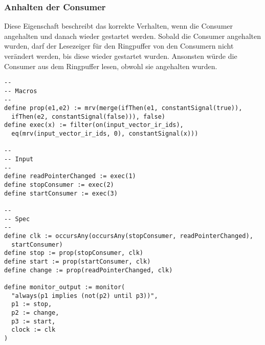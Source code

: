 \documentclass{article}
\begin{document}
\subsubsection{Anhalten der Consumer}

Diese Eigenschaft beschreibt das korrekte Verhalten, wenn die Consumer angehalten und danach wieder gestartet werden. Sobald die Consumer angehalten wurden, darf der Lesezeiger für den Ringpuffer von den Consumern nicht verändert werden, bis diese wieder gestartet wurden. Ansonsten würde die Consumer aus dem Ringpuffer lesen, obwohl sie angehalten wurden.

\begin{lstlisting}[language=tessla+salt]
--
-- Macros
--
define prop(e1,e2) := mrv(merge(ifThen(e1, constantSignal(true)), 
  ifThen(e2, constantSignal(false))), false)
define exec(x) := filter(on(input_vector_ir_ids), 
  eq(mrv(input_vector_ir_ids, 0), constantSignal(x)))

--
-- Input
--
define readPointerChanged := exec(1)
define stopConsumer := exec(2)
define startConsumer := exec(3)

--
-- Spec
--
define clk := occursAny(occursAny(stopConsumer, readPointerChanged), 
  startConsumer)
define stop := prop(stopConsumer, clk)
define start := prop(startConsumer, clk)
define change := prop(readPointerChanged, clk)

define monitor_output := monitor(
  "always(p1 implies (not(p2) until p3))",
  p1 := stop,
  p2 := change,
  p3 := start,
  clock := clk
)
\end{lstlisting}
\end{document}
